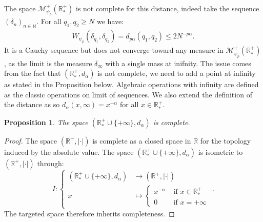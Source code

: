 \documentclass[11pt,a4paper]{article}
\newcommand{\RR}{\mathbb{R}}
\newcommand{\RRP}{\mathbb{R}^+_*}
\newcommand{\MC}{\mathcal{M}}
\newcommand{\Seq}[1]{\left(#1\right)_{n\in \mathbb{N}}}
\newtheorem{proposition}[theorem]{Proposition}
\begin{document}
The space $\MC^+_{\psi_p}\left(\RRP \right)$ is not complete for this distance, indeed take the sequence $\Seq{\delta_{n}}$. For all $q_1,q_2 \geq N$ we have:
\begin{align*}
    W_{\psi_p}\left(\delta_{q_1},\delta_{q_2}\right) = d_{p\alpha}\left(q_1,q_2 \right) \leq 2N^{-p\alpha}.
\end{align*}
It is a Cauchy sequence but does not converge toward any measure in $\MC^+_{\psi_p}\left(\RRP \right)$, as the limit is the measure $\delta_{\infty}$ with a single mass at inifnity. The issue comes from the fact that $\left(\RRP,d_\alpha\right)$ is not complete, we need to add a point at infinity as stated in the Proposition below. Algebraic operations with infinity are defined as the classic operations on limit of sequences. We also extend the definition of the distance as so $d_{\alpha}(x,\infty) = x^{-\alpha}$ for all $x \in \RRP$.
\begin{proposition}
    The space $\left(\RRP \cup \lbrace+\infty\rbrace ,d_\alpha\right)$ is complete. 
\end{proposition}
\begin{proof}
    The space $(\RR^+,|\cdot|)$ is complete as a closed space in $\RR$ for the topology induced by the absolute value. The space $\left(\RRP \cup \lbrace+\infty\rbrace ,d_\alpha\right)$ is isometric to $(\RR^+,|\cdot|)$ through:
    \begin{equation*}
        I :
        \left\lbrace
        \begin{aligned}
            \left(\RRP \cup \lbrace+\infty\rbrace ,d_\alpha\right) &\to (\RR^+,|\cdot|)  \\
            x &\mapsto 
            \left\lbrace 
            \begin{aligned}
                x^{-\alpha} &\text{ if } x \in \RRP \\
                0 &\text{ if } x= +\infty
            \end{aligned}
            \right.
        \end{aligned}
        \right. .
    \end{equation*}
    The targeted space therefore inherits completeness.
\end{proof}
\end{document}

